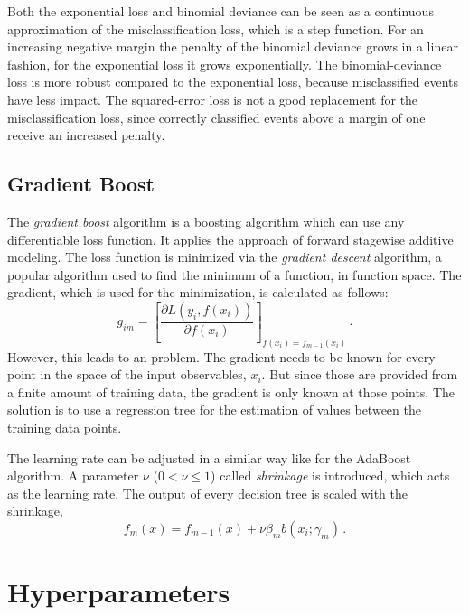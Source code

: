 Both the exponential loss and binomial deviance can be seen as a continuous approximation of the misclassification loss,
which is a step function.
For an increasing negative margin the penalty of the binomial deviance grows in a linear fashion, for the exponential loss
it grows exponentially.
The binomial-deviance loss is more robust compared to the exponential loss, because misclassified events have less impact.
The squared-error loss is not a good replacement for the misclassification loss, since correctly classified events
above a margin of one receive an increased penalty.

\subsection{Gradient Boost}\label{sub:bdt:boosting:gradient_boost}

The \emph{gradient boost} algorithm is a boosting algorithm which can use any differentiable loss function.
It applies the approach of forward stagewise additive modeling.
The loss function is minimized via the \emph{gradient descent} algorithm, a popular algorithm used to find the minimum
of a function, in function space.
The gradient, which is used for the minimization, is calculated as follows:
\begin{equation}
    g_{im} = {\left[ \frac{\partial L(y_i, f(x_i))}{\partial f(x_i)} \right]}_{f(x_i) = f_{m-1}(x_i)} \,.
\end{equation}
However, this leads to an problem.
The gradient needs to be known for every point in the space of the input observables, $x_i$.
But since those are provided from a finite amount of training data, the gradient is only known at those points.
The solution is to use a regression tree for the estimation of values between the training data points.

The learning rate can be adjusted in a similar way like for the AdaBoost algorithm.
A parameter $\nu$ ($0 < \nu \leq 1$) called \emph{shrinkage} is introduced, which acts as the learning rate.
The output of every decision tree is scaled with the shrinkage,
\begin{equation}
    f_m(x) = f_{m-1}(x) + \nu \beta_m b(x_i; \gamma_m) \,.
\end{equation}

\section{Hyperparameters}\label{sec:bdt:hyperparameters}

